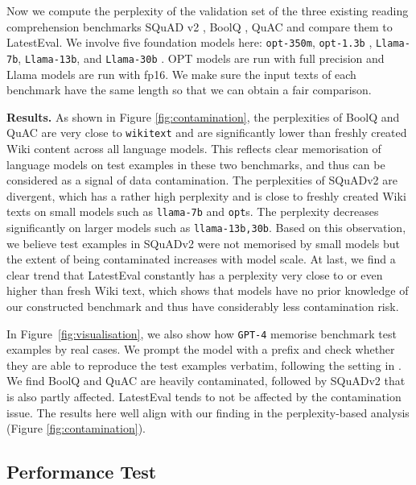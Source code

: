 \documentclass[letterpaper]{article} %
\begin{document}
Now we compute the perplexity of the validation set of the three existing reading comprehension benchmarks SQuAD v2 \cite{rajpurkar2018know}, BoolQ \cite{clark2019boolq}, QuAC \cite{choi2018quac} and compare them to LatestEval. We involve five foundation models here: \texttt{opt-350m}, \texttt{opt-1.3b} \cite{zhang2022opt}, \texttt{Llama-7b}, \texttt{Llama-13b}, and \texttt{Llama-30b} \cite{touvron2023llama}.
OPT models are run with full precision and Llama models are run with fp16. We make sure the input texts of each benchmark have the same length so that we can obtain a fair comparison.

\noindent\textbf{Results.} As shown in Figure \ref{fig:contamination}, the perplexities of BoolQ and QuAC are very close to \texttt{wikitext} and are significantly lower than freshly created Wiki content across all language models. This reflects clear memorisation of language models on test examples in these two benchmarks, and thus can be considered as a signal of data contamination. The perplexities of SQuADv2 are divergent, which has a rather high perplexity and is close to freshly created Wiki texts on small models such as \texttt{llama-7b} and \texttt{opt}s. The perplexity decreases significantly on larger models such as \texttt{llama-13b,30b}. Based on this observation, we believe test examples in SQuADv2 were not memorised by small models but the extent of being contaminated increases with model scale. At last, we find a clear trend that LatestEval constantly has a perplexity very close to or even higher than fresh Wiki text, which shows that models have no prior knowledge of our constructed benchmark and thus have considerably less contamination risk.

In Figure~\ref{fig:visualisation}, we also show how \texttt{GPT-4} memorise benchmark test examples by real cases. We prompt the model with a prefix and check whether they are able to reproduce the test examples verbatim, following the setting in \cite{carlini2022quantifying}. We find BoolQ and QuAC are heavily contaminated, followed by SQuADv2 that is also partly affected. LatestEval tends to not be affected by the contamination issue. The results here well align with our finding in the perplexity-based analysis (Figure \ref{fig:contamination}).

\subsection{Performance Test}
\end{document}

